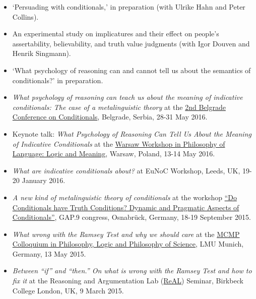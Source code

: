 \documentclass[a4paper,12pt]{article}
\begin{document}
\begin{small}
\begin{itemize}
   \item `Persuading with conditionals,' in preparation (with Ulrike Hahn and Peter Collins).
   \item An experimental study on implicatures and their effect on people's assertability, believability, and truth value judgments (with Igor Douven and Henrik Singmann).
   \item `What psychology of reasoning can and cannot tell us about the semantics of conditionals?' in preparation.  
  \end{itemize}
  

  \begin{itemize} 

    \item \emph{What psychology of reasoning can teach us about the meaning of indicative conditionals: The case of a metalinguistic theory} at the \href{http://www.f.bg.ac.rs/fil-konf/konferencija2-home.html}{2nd Belgrade Conference on Conditionals}, Belgrade, Serbia, 28-31  May 2016.

    \item Keynote talk: \emph{What Psychology of Reasoning Can Tell Us About the Meaning of Indicative Conditionals} at the \href{http://logicalconnectives.uw.edu.pl/}{Warsaw Workshop in Philosophy of Language: Logic and Meaning}, Warsaw, Poland, 13-14 May 2016.

    \item \emph{What are indicative conditionals about?} at EuNoC Workshop, Leeds, UK, 19-20 January 2016.

    \item \emph{A new kind of metalinguistic theory of conditionals} at the workshop \href{http://cms.uni-konstanz.de/what-if/events/workshop-in-osnabrueck-september-2015-p1-and-p7/}{``Do Conditionals have Truth Conditions? Dynamic and Pragmatic Aspects of Conditionals''}, GAP.9 congress, Osnabrück, Germany, 18-19 September 2015.

    \item \emph{What wrong with the Ramsey Test and why we should care} at the \href{http://www.mcmp.philosophie.uni-muenchen.de/events/weekly_talks_new/index.html}{MCMP Colloquium in Philosophy, Logic and Philosophy of Science}, LMU Munich, Germany, 13 May 2015.

    \item \emph{Between ``if'' and ``then.'' On what is wrong with the Ramsey Test and how to fix it} at the Reasoning and Argumentation Lab (\href{http://www.bbk.ac.uk/psychology/ral}{ReAL}) Seminar, Birkbeck College London, UK, 9 March 2015.


\end{itemize}
\end{small}
\end{document}

